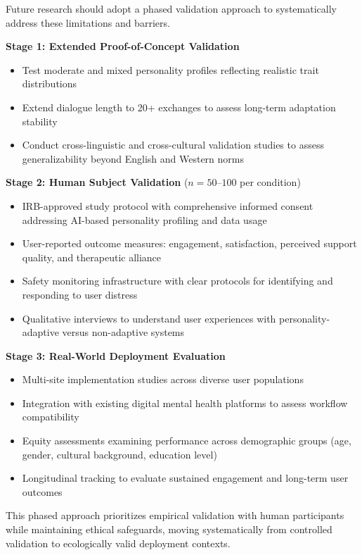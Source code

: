 Future research should adopt a phased validation approach to systematically address these limitations and barriers.

\textbf{Stage 1: Extended Proof-of-Concept Validation}
\begin{itemize}
\tightlist
\item Test moderate and mixed personality profiles reflecting realistic trait distributions
\item Extend dialogue length to 20+ exchanges to assess long-term adaptation stability
\item Conduct cross-linguistic and cross-cultural validation studies to assess generalizability beyond English and Western norms
\end{itemize}

\textbf{Stage 2: Human Subject Validation} ($n = 50$--$100$ per condition)
\begin{itemize}
\tightlist
\item IRB-approved study protocol with comprehensive informed consent addressing AI-based personality profiling and data usage
\item User-reported outcome measures: engagement, satisfaction, perceived support quality, and therapeutic alliance
\item Safety monitoring infrastructure with clear protocols for identifying and responding to user distress
\item Qualitative interviews to understand user experiences with personality-adaptive versus non-adaptive systems
\end{itemize}

\textbf{Stage 3: Real-World Deployment Evaluation}
\begin{itemize}
\tightlist
\item Multi-site implementation studies across diverse user populations
\item Integration with existing digital mental health platforms to assess workflow compatibility
\item Equity assessments examining performance across demographic groups (age, gender, cultural background, education level)
\item Longitudinal tracking to evaluate sustained engagement and long-term user outcomes
\end{itemize}

This phased approach prioritizes empirical validation with human participants while maintaining ethical safeguards, moving systematically from controlled validation to ecologically valid deployment contexts.

